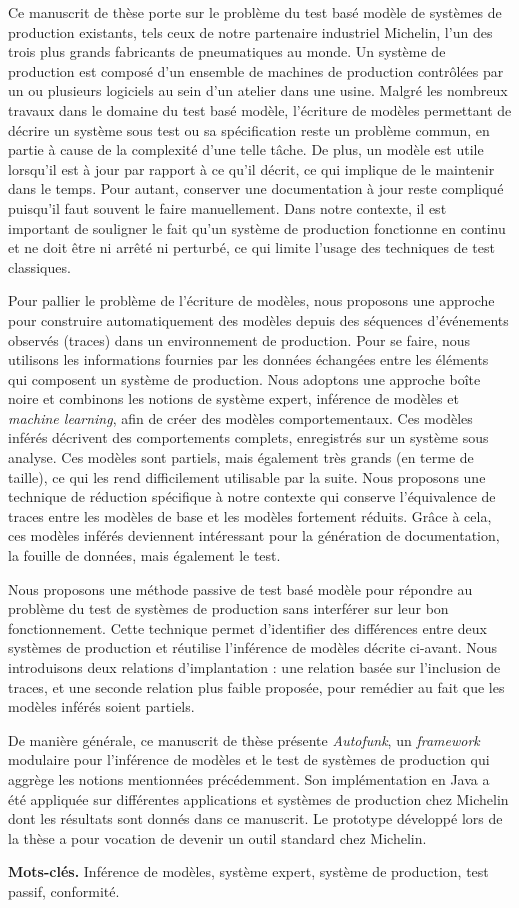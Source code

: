 Ce manuscrit de thèse porte sur le problème du test basé modèle de
systèmes de production existants, tels ceux de notre partenaire
industriel Michelin, l'un des trois plus grands fabricants de
pneumatiques au monde. Un système de production est composé d'un
ensemble de machines de production contrôlées par un ou plusieurs
logiciels au sein d'un atelier dans une usine. Malgré les nombreux
travaux dans le domaine du test basé modèle, l'écriture de
modèles permettant de décrire un système sous test ou sa
spécification reste un problème commun, en partie à cause de la
complexité d'une telle tâche. De plus, un modèle est utile
lorsqu'il est à jour par rapport à ce qu'il décrit, ce qui
implique de le maintenir dans le temps. Pour autant,
conserver une documentation à jour reste compliqué puisqu'il faut
souvent le faire manuellement. Dans notre contexte, il est
important de souligner le fait qu'un système de production
fonctionne en continu et ne doit être ni arrêté ni perturbé, ce
qui limite l'usage des techniques de test classiques.

Pour pallier le problème de l'écriture de modèles, nous proposons
une approche pour construire automatiquement des modèles depuis
des séquences d'événements observés (traces) dans un
environnement de production. Pour se faire, nous utilisons les
informations fournies par les données échangées entre les
éléments qui composent un système de production. Nous adoptons
une approche boîte noire et combinons les notions de système
expert, inférence de modèles et \emph{machine learning}, afin de
créer des modèles comportementaux. Ces modèles inférés décrivent
des comportements complets, enregistrés sur un système sous
analyse. Ces modèles
sont partiels, mais également très grands (en terme de taille),
ce qui les rend difficilement utilisable par la suite. Nous
proposons une technique de réduction spécifique à notre contexte
qui conserve l'équivalence de traces entre les modèles de base et
les modèles fortement réduits. Grâce à cela, ces modèles inférés
deviennent intéressant pour la génération de documentation, la
fouille de données, mais également le test.

Nous proposons une méthode passive de test basé modèle pour
répondre au problème du test de systèmes de production sans
interférer sur leur bon fonctionnement. Cette technique permet
d'identifier des différences entre deux systèmes de production et
réutilise l'inférence de modèles décrite ci-avant. Nous
introduisons deux relations d'implantation : une relation basée
sur l'inclusion de traces, et une seconde relation plus faible
proposée, pour remédier au fait que les modèles inférés soient
partiels.

De manière générale, ce manuscrit de thèse présente
\emph{Autofunk}, un \emph{framework} modulaire pour l'inférence
de modèles et le test de systèmes de production qui aggrège les
notions mentionnées précédemment. Son implémentation en Java a
été appliquée sur différentes applications et systèmes de
production chez Michelin dont les résultats sont donnés dans ce
manuscrit. Le prototype développé lors de la thèse a pour
vocation de devenir un outil standard chez Michelin.

\textbf{Mots-clés.} Inférence de modèles, système expert, système
de production, test passif, conformité.
